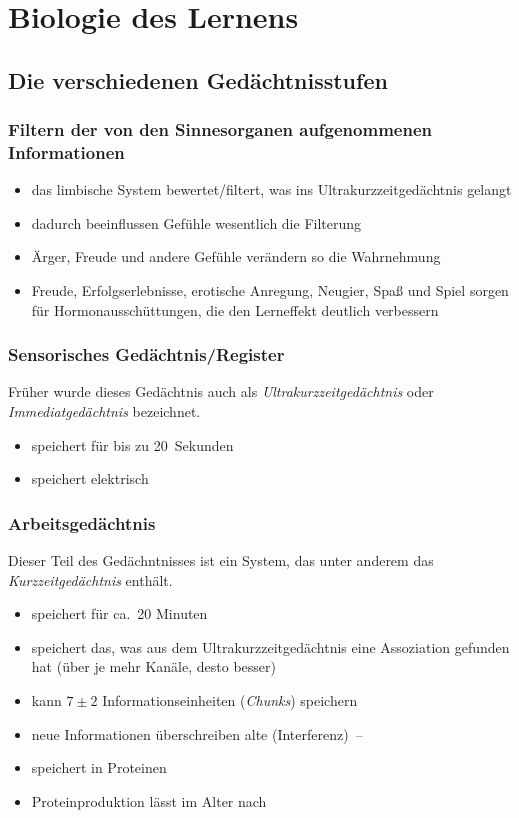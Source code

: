 \section{Biologie des Lernens}
\label{lernbiologie}

\subsection{Die verschiedenen Gedächtnisstufen}
\subsubsection{Filtern der von den Sinnesorganen aufgenommenen Informationen}
\begin{itemize}
  \item das limbische System bewertet/filtert, was ins Ultrakurzzeitgedächtnis gelangt
  \item dadurch beeinflussen Gefühle wesentlich die Filterung
  \item Ärger, Freude und andere Gefühle verändern so die Wahrnehmung
  \item Freude, Erfolgserlebnisse, erotische Anregung, Neugier, Spaß und Spiel sorgen für Hormonausschüttungen, die den Lerneffekt deutlich verbessern
\end{itemize}

\subsubsection{Sensorisches Gedächtnis/Register}
Früher wurde dieses Gedächtnis auch als \emph{Ultrakurzzeitgedächtnis} oder \emph{Immediatgedächtnis} bezeichnet.

\begin{itemize}
  \item speichert für bis zu 20~Sekunden
  \item speichert elektrisch
\end{itemize}

\subsubsection{Arbeitsgedächtnis}
Dieser Teil des Gedächntnisses ist ein System, das unter anderem das \emph{Kurzzeitgedächtnis} enthält.
\begin{itemize}
  \item speichert für ca.~20 Minuten
  \item speichert das, was aus dem Ultrakurzzeitgedächtnis eine Assoziation gefunden hat (über je mehr Kanäle, desto besser)
  \item kann $7\pm 2$ Informationseinheiten (\emph{Chunks}) speichern
  \item neue Informationen überschreiben alte (Interferenz)~-- 
  \item speichert in Proteinen
  \item Proteinproduktion lässt im Alter nach
\end{itemize}

